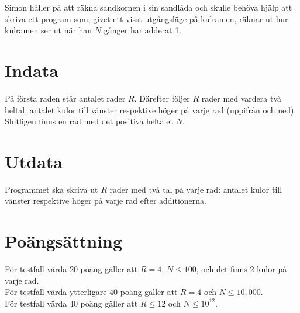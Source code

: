 Simon håller på att räkna sandkornen i sin sandlåda och skulle behöva hjälp
att skriva ett program som, givet ett visst utgångsläge på kulramen,
räknar ut hur kulramen ser ut när han $N$ gånger har adderat
1.

\section*{Indata}
På första raden står antalet rader $R$. Därefter följer $R$ rader med vardera två heltal, antalet kulor
till vänster respektive höger på varje rad (uppifrån och ned). Slutligen finns en rad med 
det positiva heltalet $N$. 

\section*{Utdata} 

Programmet ska skriva ut $R$ rader med två tal på
varje rad: antalet kulor till vänster respektive höger på varje rad
efter additionerna.

\section*{Poängsättning}

För testfall värda $20$ poäng gäller att $R=4$,  $N\le 100$, och det finns 2 kulor
på varje rad.\\
För testfall värda ytterligare $40$ poäng gäller att $R=4$ och $N\le 10,000$.\\
För testfall värda $40$ poäng gäller att $R\le 12$ och $N\le 10^{12}$.

